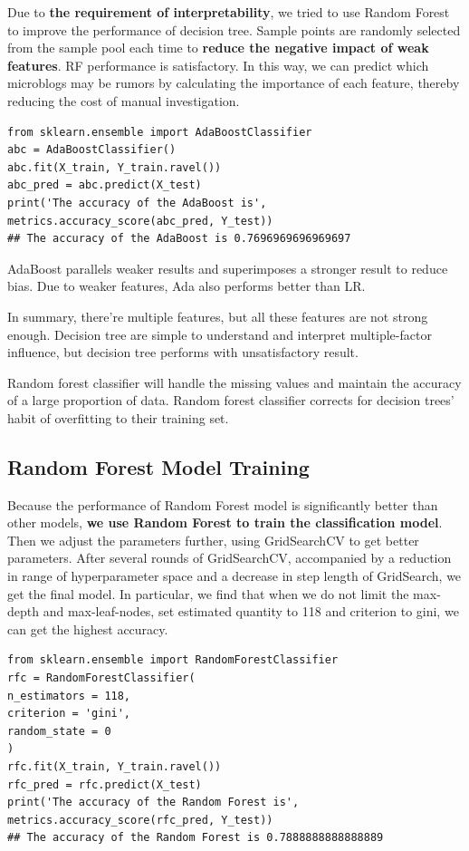 \documentclass[12pt,a4paper]{article}
\begin{document}
Due to \textbf{the requirement of interpretability}, we tried to use Random Forest to improve the performance of decision tree. Sample points are randomly selected from the sample pool each time to \textbf{reduce the negative impact of weak features}. RF performance is satisfactory. In this way, we can predict which microblogs may be rumors by calculating the importance of each feature, thereby reducing the cost of manual investigation.

\begin{lstlisting}
from sklearn.ensemble import AdaBoostClassifier
abc = AdaBoostClassifier()
abc.fit(X_train, Y_train.ravel())
abc_pred = abc.predict(X_test)
print('The accuracy of the AdaBoost is', metrics.accuracy_score(abc_pred, Y_test))
## The accuracy of the AdaBoost is 0.7696969696969697
\end{lstlisting}

AdaBoost parallels weaker results and superimposes a stronger result to reduce bias. Due to weaker features, Ada also performs better than LR.

In summary, there’re multiple features, but all these features are not strong enough. Decision tree are simple to understand and interpret multiple-factor influence, but decision tree performs with unsatisfactory result. 

Random forest classifier will handle the missing values and maintain the accuracy of a large proportion of data.
Random forest classifier corrects for decision trees' habit of overfitting to their training set.

\subsection{Random Forest Model Training}
Because the performance of Random Forest model is significantly better than other models, \textbf{we use Random Forest to train the classification model}. Then we adjust the parameters further, using GridSearchCV to get better parameters. After several rounds of GridSearchCV, accompanied by a reduction in range of hyperparameter space and a decrease in step length of GridSearch, we get the final model. In particular, we find that when we do not limit the max-depth and max-leaf-nodes, set estimated quantity to 118 and criterion to gini, we can get the highest accuracy. 

\begin{lstlisting}
from sklearn.ensemble import RandomForestClassifier
rfc = RandomForestClassifier(
n_estimators = 118,
criterion = 'gini',
random_state = 0
)
rfc.fit(X_train, Y_train.ravel())
rfc_pred = rfc.predict(X_test)
print('The accuracy of the Random Forest is', metrics.accuracy_score(rfc_pred, Y_test))
## The accuracy of the Random Forest is 0.7888888888888889
\end{lstlisting}
\end{document}
